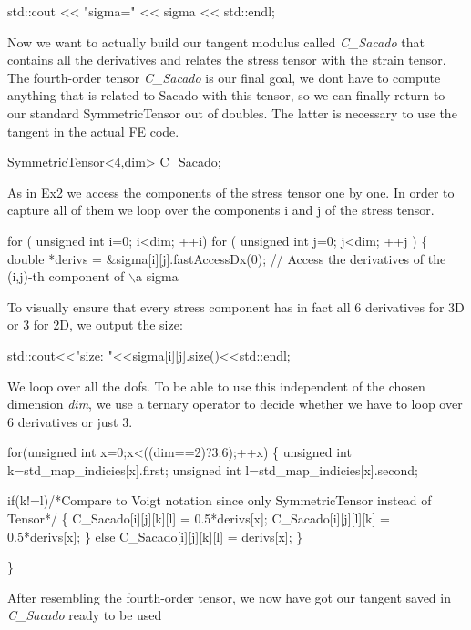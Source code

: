 \begin{DoxyCode}
std::cout << \textcolor{stringliteral}{"sigma="} << sigma << std::endl;
\end{DoxyCode}
 Now we want to actually build our tangent modulus called {\itshape C\+\_\+\+Sacado} that contains all the derivatives and relates the stress tensor with the strain tensor. ~\newline
The fourth-\/order tensor {\itshape C\+\_\+\+Sacado} is our final goal, we don\textquotesingle{}t have to compute anything that is related to Sacado with this tensor, so we can finally return to our standard Symmetric\+Tensor out of doubles. The latter is necessary to use the tangent in the actual FE code. 
\begin{DoxyCode}
SymmetricTensor<4,dim> C\_Sacado;
\end{DoxyCode}
 As in Ex2 we access the components of the stress tensor one by one. In order to capture all of them we loop over the components i and j of the stress tensor. 
\begin{DoxyCode}
\textcolor{keywordflow}{for} ( \textcolor{keywordtype}{unsigned} \textcolor{keywordtype}{int} i=0; i<dim; ++i)
    \textcolor{keywordflow}{for} ( \textcolor{keywordtype}{unsigned} \textcolor{keywordtype}{int} j=0; j<dim; ++j )
    \{
        \textcolor{keywordtype}{double} *derivs = &sigma[i][j].fastAccessDx(0); \textcolor{comment}{// Access the derivatives of the (i,j)-th component
       of \(\backslash\)a sigma}
\end{DoxyCode}
 To visually ensure that every stress component has in fact all 6 derivatives for 3D or 3 for 2D, we output the size\+: 
\begin{DoxyCode}
std::cout<<\textcolor{stringliteral}{"size: "}<<sigma[i][j].size()<<std::endl;
\end{DoxyCode}
 We loop over all the dofs. To be able to use this independent of the chosen dimension {\itshape dim}, we use a ternary operator to decide whether we have to loop over 6 derivatives or just 3. 
\begin{DoxyCode}
    \textcolor{keywordflow}{for}(\textcolor{keywordtype}{unsigned} \textcolor{keywordtype}{int} x=0;x<((dim==2)?3:6);++x)
    \{
        \textcolor{keywordtype}{unsigned} \textcolor{keywordtype}{int} k=std\_map\_indicies[x].first;
        \textcolor{keywordtype}{unsigned} \textcolor{keywordtype}{int} l=std\_map\_indicies[x].second;

        \textcolor{keywordflow}{if}(k!=l)\textcolor{comment}{/*Compare to Voigt notation since only SymmetricTensor instead of Tensor*/}
        \{
            C\_Sacado[i][j][k][l] = 0.5*derivs[x];
            C\_Sacado[i][j][l][k] = 0.5*derivs[x];
        \}
        \textcolor{keywordflow}{else}
            C\_Sacado[i][j][k][l] = derivs[x];
    \}            

\}
\end{DoxyCode}
 After resembling the fourth-\/order tensor, we now have got our tangent saved in {\itshape C\+\_\+\+Sacado} ready to be used

